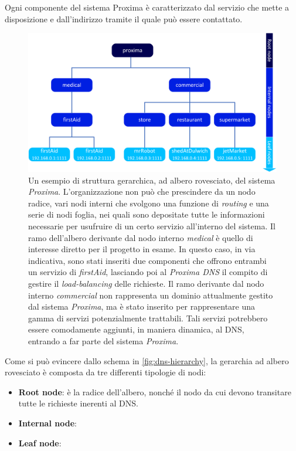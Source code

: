 \documentclass[a4paper,12pt]{report}
\begin{document}
Ogni componente del sistema Proxima è caratterizzato dal servizio che mette a disposizione e dall'indirizzo tramite il quale può essere contattato.

\begin{figure}[H]
	\hspace*{-0.8in}
	\includegraphics{./img/dns-hierarchy.png}
	\caption{Un esempio di struttura gerarchica, ad albero rovesciato, del sistema \emph{Proxima}. L'organizzazione non può che prescindere da un nodo radice, vari nodi interni che svolgono una funzione di \emph{routing} e una serie di nodi foglia, nei quali sono depositate tutte le informazioni necessarie per usufruire di un certo servizio all'interno del sistema. Il ramo dell'albero derivante dal nodo interno \emph{medical} è quello di interesse diretto per il progetto in esame. In questo caso, in via indicativa, sono stati inseriti due componenti che offrono entrambi un servizio di \emph{firstAid}, lasciando poi al \emph{Proxima DNS} il compito di gestire il \emph{load-balancing} delle richieste. Il ramo derivante dal nodo interno \emph{commercial} non rappresenta un dominio attualmente gestito dal sistema \emph{Proxima}, ma è stato inserito per rappresentare una gamma di servizi potenzialmente trattabili. Tali servizi potrebbero essere comodamente aggiunti, in maniera dinamica, al DNS, entrando a far parte del sistema \emph{Proxima}. }
	\label{fig:dns-hierarchy}
\end{figure}

Come si può evincere dallo schema in \autoref{fig:dns-hierarchy}, la gerarchia ad albero rovesciato è composta da tre differenti tipologie di nodi:
\begin{itemize}
	\item \textbf{Root node}: è la radice dell'albero, nonché il nodo da cui devono transitare tutte le richieste inerenti al DNS.
	\item \textbf{Internal node}:
	\item \textbf{Leaf node}:
\end{itemize}
\end{document}
